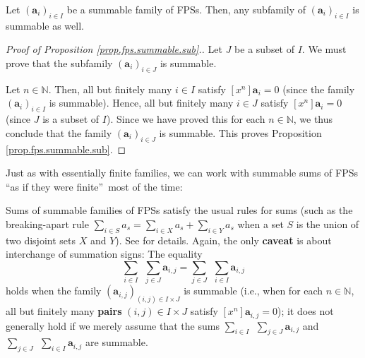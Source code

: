 \begin{proposition}
\label{prop.fps.summable.sub}Let $\left(  \mathbf{a}_{i}\right)  _{i\in I}$ be
a summable family of FPSs. Then, any subfamily of $\left(  \mathbf{a}%
_{i}\right)  _{i\in I}$ is summable as well.
\end{proposition}

\begin{proof}
[Proof of Proposition \ref{prop.fps.summable.sub}.]Let $J$ be a subset of $I$.
We must prove that the subfamily $\left(  \mathbf{a}_{i}\right)  _{i\in J}$ is summable.

Let $n\in\mathbb{N}$. Then, all but finitely many $i\in I$ satisfy $\left[
x^{n}\right]  \mathbf{a}_{i}=0$ (since the family $\left(  \mathbf{a}%
_{i}\right)  _{i\in I}$ is summable). Hence, all but finitely many $i\in J$
satisfy $\left[  x^{n}\right]  \mathbf{a}_{i}=0$ (since $J$ is a subset of
$I$). Since we have proved this for each $n\in\mathbb{N}$, we thus conclude
that the family $\left(  \mathbf{a}_{i}\right)  _{i\in J}$ is summable. This
proves Proposition \ref{prop.fps.summable.sub}.
\end{proof}

Just as with essentially finite families, we can work with summable sums of
FPSs \textquotedblleft as if they were finite\textquotedblright\ most of the time:

\begin{proposition}
\label{prop.fps.summable-sums-rule}Sums of summable families of FPSs satisfy
the usual rules for sums (such as the breaking-apart rule $\sum_{i\in S}%
a_{s}=\sum_{i\in X}a_{s}+\sum_{i\in Y}a_{s}$ when a set $S$ is the union of
two disjoint sets $X$ and $Y$). See \cite[Proposition 7.2.11]{19s} for
details. Again, the only \textbf{caveat} is about interchange of summation
signs: The equality
\[
\sum_{i\in I}\ \ \sum_{j\in J}\mathbf{a}_{i,j}=\sum_{j\in J}\ \ \sum_{i\in
I}\mathbf{a}_{i,j}%
\]
holds when the family $\left(  \mathbf{a}_{i,j}\right)  _{\left(  i,j\right)
\in I\times J}$ is summable (i.e., when for each $n\in\mathbb{N}$, all but
finitely many \textbf{pairs} $\left(  i,j\right)  \in I\times J$ satisfy
$\left[  x^{n}\right]  \mathbf{a}_{i,j}=0$); it does not generally hold if we
merely assume that the sums $\sum_{i\in I}\ \ \sum_{j\in J}\mathbf{a}_{i,j}$
and $\sum_{j\in J}\ \ \sum_{i\in I}\mathbf{a}_{i,j}$ are summable.
\end{proposition}

